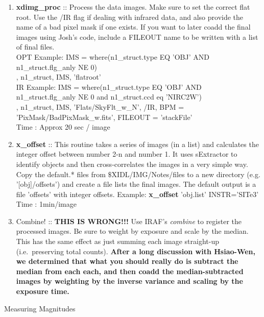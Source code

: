 \documentclass[11pt,letterpaper,dvips]{article}
\begin{document}
\begin{enumerate}
\begin{enumerate}
	  \item {\bf xdimg\_proc} :: Process the data images.  Make sure to set
		the correct flat root.  Use the /IR flag if dealing with infrared data, and also provide the name of a bad pixel mask if one exists.  If you want to later coadd the final images using Josh's code, include a FILEOUT name to be written with a list of final files. \\
		\quad OPT Example: IMS = where(n1\_struct.type EQ 'OBJ' AND n1\_struct.flg\_anly NE 0) \\
         	\quad\quad{}, n1\_struct, IMS, 'flatroot' \\
                \quad IR Example: IMS =  where(n1\_struct.type EQ 'OBJ' AND n1\_struct.flg\_anly NE 0 and n1\_struct.ccd eq 'NIRC2W') \\
               \quad\quad{}, n1\_struct, IMS, 'Flats/SkyFlt\_w\_N', /IR, BPM = 'PixMask/BadPixMask\_w.fits', FILEOUT = 'stackFile' \\
	        \quad Time   : Approx 20 sec / image  

	  \item {\bf x\_offset} :: This routine takes a series of images (in a list)
		and calculates the integer offset between number 2-n and number 1.
		It uses sExtractor to identify objects and then cross-correlates
		the images in a very simple way.
		Copy the default.* files from $\$$XIDL/IMG/Notes/files to a 
		new directory (e.g. '[obj]/offsets') and create a file lists the
		final images. The default output is a file 'offsets' with
		integer offsets.
         	\quad Example: {\bf x\_offset} 'obj.list' INSTR='SITe3'\\
	        \quad Time   : 1min/image \\

	  \item Combine! :: {\bf THIS IS WRONG!!!} Use IRAF's {\it combine} to register the processed
		images.  Be sure to weight by exposure and scale by the median.
		This has the same effect as just summing each image straight-up
		(i.e.\ preserving total counts).
                {\bf After a long discussion with Hsiao-Wen, we determined that what you should really do is subtract the median from each each, and then coadd the median-subtracted images by weighting by the inverse variance and scaling by the exposure time.}

	\end{enumerate}



{\Large  \item Measuring Magnitudes} \\


\end{enumerate}
\end{document}
